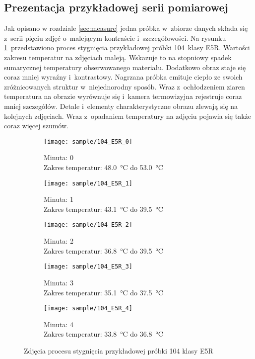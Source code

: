 \subsection{Prezentacja przykładowej serii pomiarowej}
Jak opisano w rozdziale \ref{sec:measure} jedna próbka w~zbiorze danych
składa się z~serii pięciu zdjęć o~malejącym kontraście i~szczegółowości.
Na rysunku \ref{fig:sample}~przedstawiono proces stygnięcia przykładowej
próbki 104~klasy E5R.
Wartości zakresu temperatur na zdjęciach maleją.
Wskazuje to na stopniowy spadek sumarycznej temperatury obserwowanego
materiału.
Dodatkowo obraz staje się coraz mniej wyraźny i~kontrastowy.
Nagrzana próbka emituje ciepło ze swoich zróżnicowanych struktur
w~niejednorodny sposób.
Wraz z~ochłodzeniem ziaren temperatura na obrazie wyrównuje się i~kamera
termowizyjna rejestruje coraz mniej szczegółów.
Detale i~elementy charakterystyczne obrazu zlewają się na kolejnych zdjęciach.
Wraz z~opadaniem temperatury na zdjęciu pojawia się także coraz więcej szumów.
\begin{figure}[htbp]
	\centering
	\begin{subfigure}{0.45\textwidth}
		\centering
		\texttt{[image: sample/104\_E5R\_0]}
		\caption{Minuta: 0 \\
			Zakres temperatur: \SI{48.0}{\celsius} do
			\SI{53.0}{\celsius}}
	\end{subfigure}
	\hspace{0.75cm}
	\vspace{0.5cm}
	\begin{subfigure}{0.45\textwidth}
		\centering
		\texttt{[image: sample/104\_E5R\_1]}
		\caption{Minuta: 1 \\
			Zakres temperatur: \SI{43.1}{\celsius} do
			\SI{39.5}{\celsius}}
	\end{subfigure}
	\begin{subfigure}{0.45\textwidth}
		\centering
		\texttt{[image: sample/104\_E5R\_2]}
		\caption{Minuta: 2 \\
			Zakres temperatur: \SI{36.8}{\celsius} do
			\SI{39.5}{\celsius}}
	\end{subfigure}
	\hspace{0.75cm}
	\vspace{0.5cm}
	\begin{subfigure}{0.45\textwidth}
		\centering
		\texttt{[image: sample/104\_E5R\_3]}
		\caption{Minuta: 3 \\
			Zakres temperatur: \SI{35.1}{\celsius} do
			\SI{37.5}{\celsius}}
	\end{subfigure}
	\begin{subfigure}{0.45\textwidth}
		\centering
		\texttt{[image: sample/104\_E5R\_4]}
		\caption{Minuta: 4 \\
			Zakres temperatur: \SI{33.8}{\celsius} do
			\SI{36.8}{\celsius}}
	\end{subfigure}
	\caption{Zdjęcia procesu stygnięcia przykładowej próbki 104 klasy E5R}
	\label{fig:sample}
\end{figure}

